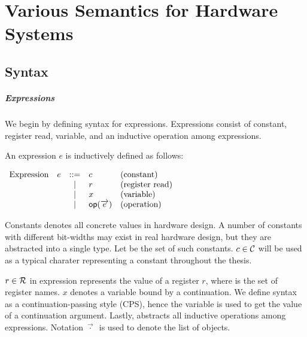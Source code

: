 \chapter{Various Semantics for Hardware Systems}

\section{Syntax}

\paragraph{Expressions}
We begin by defining syntax for expressions. Expressions
consist of constant, register read, variable, and an inductive
operation among expressions.

\begin{definition}
  \label{def-expression}
  An expression $e$ is inductively defined as follows:
  \begin{center}
    \begin{math}
      \begin{array}{rcll}
        \textrm{Expression}\quad e & ::= & c & \textrm{(constant)} \\
        & | & r & \textrm{(register read)} \\
        & | & x & \textrm{(variable)} \\
        & | & \textsf{op}{}(\overrightarrow{e}) & \textrm{(operation)} \\
      \end{array}
    \end{math}
  \end{center}
\end{definition}

Constants denotes all concrete values in hardware design. A number of
constants with different bit-widths may exist in real hardware design,
but they are abstracted into a single type. Let \setconst{} be the set
of such constants. $c \in \mathcal{C}{}$ will be used as a typical
charater representing a constant throughout the thesis.

$r \in \mathcal{R}{}$ in expression represents the value of a register
$r$, where \setregs{} is the set of register names. $x$ denotes a
variable bound by a continuation. We define syntax as a
continuation-passing style (CPS), hence the variable is used to get
the value of a continuation argument. Lastly,  abstracts all
inductive operations among expressions. Notation $\vec{\cdot}\ $ is
used to denote the list of objects.

